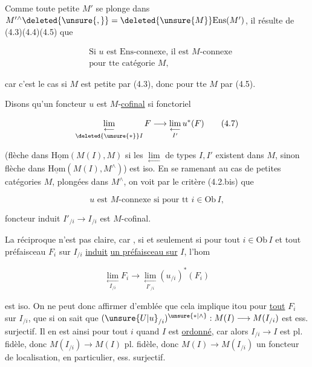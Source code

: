 Comme toute petite $M'$ se plonge dans $M'{}^\wedge\deleted{\unsure{,}}=\deleted{\unsure{M}}\mathrm{Ens}(M')$, il résulte de  (4.3)(4.4)(4.5) que 

\[
\begin{aligned}
&\text{Si }u\text{ est Ens-connexe, il est }M\text{-connexe}\\
&\text{pour tte catégorie }M,
\end{aligned}\tag*{(4.6)}
\]

car c'est le cas si $M$ est petite par (4.3), donc pour tte $M$ par (4.5).

Disons qu'un foncteur $u$  est $M$-\uline{cofinal}  si    fonctoriel

\[
\underset{\deleted{\unsure{*}}I}{\underset{\longleftarrow}{\lim}}\,F\longrightarrow
\underset{I'}{\underset{\longleftarrow}{\lim}}\,u^*(F)\tag*{(4.7)}
\]

(flèche dans $\underline{\mathrm{Hom}}(M(I),M)$ si les $\underset{\longleftarrow}{\lim}$ de types $I,I'$ existent dans $M$, sinon flèche dans $\underline{\mathrm{Hom}}(M(I),M^\wedge)$) est  iso. En se ramenant au cas de petites catégories $M$,  plongées dans $M^\wedge$, on voit par le critère (4.2.bis) que

\[
u\text{ est }M\text{-connexe si pour tt }i\in\mathrm{Ob}\,I,\tag*{(4.8.)}
\]

  foncteur induit $I'_{/i}\longrightarrow I_{/i}$ est $M$-cofinal.

La réciproque n'est pas claire, car  ,   si et seulement si pour tout $i\in\mathrm{Ob}\,I$ et tout préfaisceau $F_i$ sur $I_{/i}$  \uline{induit}  \uline{ un préfaisceau  sur} $I$, l'hom

\[
\underset{I_{/i}}{\underset{\longleftarrow}{\lim}}F_i\longrightarrow\underset{I'_{/i}}{\underset{\longleftarrow}{\lim}}(u_{/i})^*(F_i)
\]

est iso. On ne peut donc affirmer d'emblée que cela implique itou pour \uline{tout} $F_i$ sur $I_{/i}$, que si on sait que $(\unsure{U|u}_{/i})^{\unsure{*|\wedge}}:M(I)\longrightarrow M(I_{/i})$ est ess. surjectif. Il en est ainsi pour tout $i$ quand $I$ est \uline{ordonné},  car alors $I_{/i}\longrightarrow I$ est pl. fidèle, donc $M(I_{/i})\longrightarrow M(I)$ pl. fidèle, donc $M(I)\longrightarrow M(I_{/i})$ un foncteur de localisation,  en particulier, ess. surjectif.

